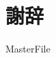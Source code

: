 \documentclass[a4j,twoside,12pt]{thesis} %
\begin{document}
\setlength{\baselineskip}{1.95zw}
\setlength{\textheight}{29\baselineskip}

\addtocounter{chapter}{+5}
\backmatter
\fi



\chapter{謝辞}
\label{chapter:acknowledgement}

\expandafter\ifx\csname MasterFile\endcsname\relax
\end{document}

